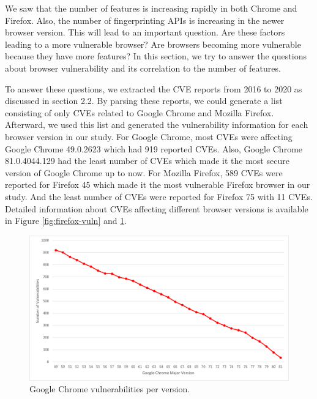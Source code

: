 We saw that the number of features is increasing rapidly in both Chrome and Firefox. Also, the number of fingerprinting APIs is increasing in the newer browser version. This will lead to an important question. Are these factors leading to a more vulnerable browser? Are browsers becoming more vulnerable because they have more features? In this section, we try to answer the questions about browser vulnerability and its correlation to the number of features.

To answer these questions, we extracted the CVE reports from 2016 to 2020 as discussed in section 2.2. By parsing these reports, we could generate a list consisting of only CVEs related to Google Chrome and Mozilla Firefox. Afterward, we used this list and generated the vulnerability information for each browser version in our study. For Google Chrome, most CVEs were affecting Google Chrome 49.0.2623 which had 919 reported CVEs. Also, Google Chrome 81.0.4044.129 had the least number of CVEs which made it the most secure version of Google Chrome up to now. For Mozilla Firefox, 589 CVEs were reported for Firefox 45 which made it the most vulnerable Firefox browser in our study. And the least number of CVEs were reported for Firefox 75 with 11 CVEs. Detailed information about CVEs affecting different browser versions is available in Figure \ref{fig:firefox-vuln} and \ref{fig:chrome-vuln}.

\begin{figure}[ht]
    \centering
    \includegraphics[width=\columnwidth]{figures/Chrome-Vulnerabilities.png}
    \caption{Google Chrome vulnerabilities per version.}
    \label{fig:chrome-vuln}
\end{figure}



